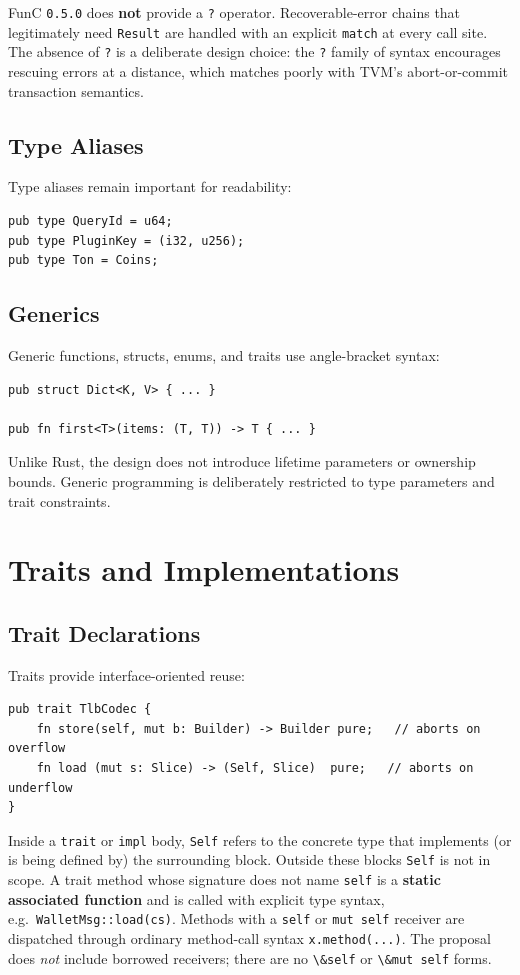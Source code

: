 \documentclass[12pt,oneside]{article}
\begin{document}
FunC \verb|0.5.0| does \textbf{not} provide a \verb|?| operator.
Recoverable-error chains that legitimately need \verb|Result| are
handled with an explicit \verb|match| at every call site. The absence
of \verb|?| is a deliberate design choice: the \verb|?| family of
syntax encourages rescuing errors at a distance, which matches poorly
with TVM's abort-or-commit transaction semantics.

\subsection{Type Aliases}
Type aliases remain important for readability:

\begin{verbatim}
pub type QueryId = u64;
pub type PluginKey = (i32, u256);
pub type Ton = Coins;
\end{verbatim}

\subsection{Generics}
Generic functions, structs, enums, and traits use angle-bracket syntax:

\begin{verbatim}
pub struct Dict<K, V> { ... }

pub fn first<T>(items: (T, T)) -> T { ... }
\end{verbatim}

Unlike Rust, the design does not introduce lifetime parameters or ownership
bounds. Generic programming is deliberately restricted to type parameters and
trait constraints.

\section{Traits and Implementations}
\subsection{Trait Declarations}
Traits provide interface-oriented reuse:

\begin{verbatim}
pub trait TlbCodec {
    fn store(self, mut b: Builder) -> Builder pure;   // aborts on overflow
    fn load (mut s: Slice) -> (Self, Slice)  pure;   // aborts on underflow
}
\end{verbatim}

Inside a \verb|trait| or \verb|impl| body, \verb|Self| refers to the concrete
type that implements (or is being defined by) the surrounding block. Outside
these blocks \verb|Self| is not in scope. A trait method whose signature does
not name \verb|self| is a \textbf{static associated function} and is called
with explicit type syntax, e.g.\ \verb|WalletMsg::load(cs)|. Methods with a
\verb|self| or \verb|mut self| receiver are dispatched through ordinary
method-call syntax \verb|x.method(...)|. The proposal does \emph{not} include
borrowed receivers; there are no \verb|\&self| or \verb|\&mut self| forms.
\end{document}
